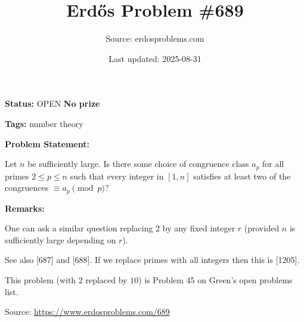 \documentclass{article}
\title{Erd\H{o}s Problem \#689}
\date{Last updated: 2025-08-31}
\author{Source: erdosproblems.com}
\begin{document}
\maketitle

\noindent\textbf{Status:} OPEN \quad \textbf{No prize}

\noindent\textbf{Tags:} number theory

\medskip
\noindent\textbf{Problem Statement:}

Let $n$ be sufficiently large. Is there some choice of congruence class $a_p$ for all primes $2\leq p\leq n$ such that every integer in $[1,n]$ satisfies at least two of the congruences $\equiv a_p\pmod{p}$?

\bigskip
\noindent\textbf{Remarks:}

One can ask a similar question replacing $2$ by any fixed integer $r$ (provided $n$ is sufficiently large depending on $r$).

See also [687] and [688]. If we replace primes with all integers then this is [1205].

This problem (with $2$ replaced by $10$) is Problem 45 on Green's open problems list.

\bigskip
\noindent\small{Source: \url{https://www.erdosproblems.com/689}}
\end{document}
